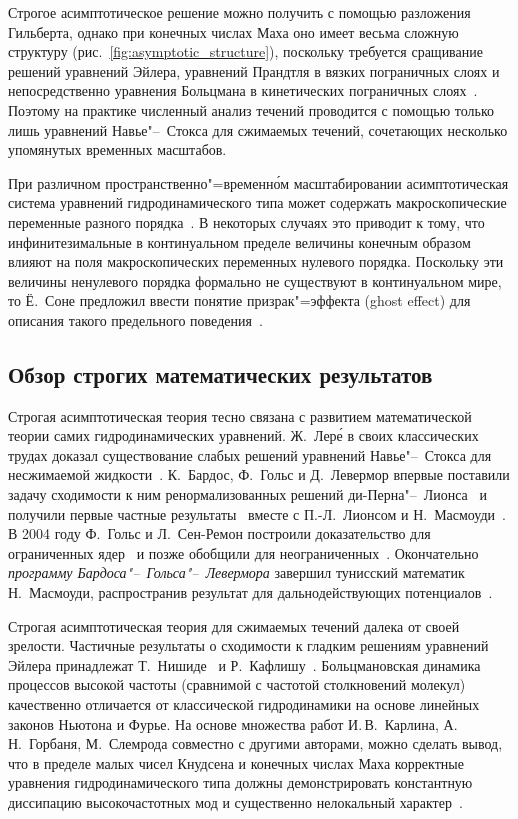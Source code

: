 Строгое асимптотическое решение можно получить с помощью разложения Гильберта,
однако при конечных числах Маха оно имеет весьма сложную структуру (рис.~\ref{fig:asymptotic_structure}),
поскольку требуется сращивание решений уравнений Эйлера, уравнений Прандтля в вязких пограничных слоях
и непосредственно уравнения Больцмана в кинетических пограничных слоях~\cite{Sone2000}.
Поэтому на практике численный анализ течений проводится с помощью только лишь уравнений Навье"--~Стокса для сжимаемых течений,
сочетающих несколько упомянутых временных масштабов.

При различном пространственно"=временн\'{о}м масштабировании асимптотическая система уравнений гидродинамического типа
может содержать макроскопические переменные разного порядка~\cite{Bardos2008}.
В некоторых случаях это приводит к тому, что инфинитезимальные в континуальном пределе величины
конечным образом влияют на поля макроскопических переменных нулевого порядка.
Поскольку эти величины ненулевого порядка формально не существуют в континуальном мире,
то Ё.~Соне предложил ввести понятие призрак"=эффекта (ghost effect) для описания такого предельного поведения~\cite{Sone2000ghost}.

\subsection{Обзор строгих математических результатов}

Строгая асимптотическая теория тесно связана с развитием математической теории самих гидродинамических уравнений.
Ж.~Лер\'{е} в своих классических трудах доказал существование слабых решений уравнений Навье"--~Стокса
для несжимаемой жидкости~\cite{Leray1934}.
К.~Бардос, Ф.~Гольс и Д.~Левермор впервые поставили задачу сходимости к ним ренормализованных решений ди-Перна"--~Лионса~\cite{Bardos1991}
и получили первые частные результаты~\cite{Bardos1993} вместе с П.-Л.~Лионсом и Н.~Масмоуди~\cite{Masmoudi2001}.
В 2004 году Ф.~Гольс и Л.~Сен-Ремон построили доказательство для ограниченных ядер~\cite{Golse2004}
и позже обобщили для неограниченных~\cite{Golse2009}.
Окончательно \emph{программу Бардоса"--~Гольса"--~Левермора} завершил тунисский математик Н.~Масмоуди,
распространив результат для дальнодействующих потенциалов~\cite{Masmoudi2010}.

Строгая асимптотическая теория для сжимаемых течений далека от своей зрелости.
Частичные результаты о сходимости к гладким решениям уравнений Эйлера принадлежат
Т.~Нишиде~\cite{Nishida1978} и Р.~Кафлишу~\cite{Caflisch1980limit}.
Больцмановская динамика процессов высокой частоты (сравнимой с частотой столкновений молекул)
качественно отличается от классической гидродинамики на основе линейных законов Ньютона и Фурье.
На основе множества работ И.\,В.~Карлина, А.\,Н.~Горбаня, М.~Слемрода совместно с другими авторами,
можно сделать вывод, что в пределе малых чисел Кнудсена и конечных числах Маха корректные уравнения
гидродинамического типа должны демонстрировать константную диссипацию высокочастотных мод
и существенно нелокальный характер~\cite{Gorban2014}.


